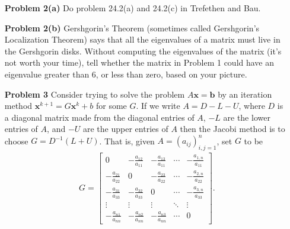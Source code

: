\documentclass[12pt]{amsart}
\theoremstyle{plain}
\theoremstyle{definition}
\theoremstyle{remark}
\numberwithin{equation}{section} %
\numberwithin{figure}{section}   %
\newcommand{\vect}[1]{\mathbf{#1}}
\newcommand{\bx}{\vect{x}}
\begin{document}
\begin{itemize}
 \item[\bf Problem 2(a)] Do problem 24.2(a) and 24.2(c) in Trefethen and Bau. 
 
 \bigskip
 
  \item[\bf Problem 2(b)]
 Gershgorin's Theorem (sometimes called Gershgorin's Localization Theorem) says that all the eigenvalues of a matrix must live in the Gershgorin disks.  Without computing the eigenvalues of the matrix (it's not worth your time), tell whether the matrix in Problem 1 could have an eigenvalue greater than 6, or less than zero, based on your picture.
 
 \bigskip
 
\item[\bf Problem 3] Consider trying to solve the problem $A\bx=\mathbf{b}$ by an iteration method $\bx^{k+1} = G\bx^k+b$ for some $G$.  If we write $A=D-L-U$, where $D$ is a diagonal matrix made from the diagonal entries of $A$, $-L$ are the lower entries of $A$, and $-U$ are the upper entries of $A$ then the Jacobi method is to choose $G = D^{-1}(L+U)$.  That is, given $A=(a_{ij})_{i,j=1}^n$, set $G$ to be
\begin{align*}
 G = \begin{bmatrix}
      0 & -\frac{a_{12}}{a_{11}} & -\frac{a_{13}}{a_{11}} & \cdots & -\frac{a_{1,n}}{a_{11}} \\
      -\frac{a_{21}}{a_{22}} & 0 & -\frac{a_{23}}{a_{22}} & \cdots & -\frac{a_{2,n}}{a_{22}} \\
      -\frac{a_{31}}{a_{33}} & -\frac{a_{32}}{a_{33}} & 0 & \cdots & -\frac{a_{3,n}}{a_{33}} \\
      \vdots &\vdots& \vdots & \ddots & \vdots \\
      -\frac{a_{n1}}{a_{nn}} & -\frac{a_{n2}}{a_{nn}} & -\frac{a_{n3}}{a_{nn}} & \cdots & 0
     \end{bmatrix}.
\end{align*}



\end{itemize}
\end{document}
